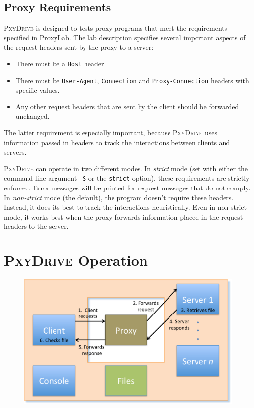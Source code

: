 \documentclass[11pt]{article}
\newcommand{\pxydrive}{\textsc{PxyDrive}}
\begin{document}
\subsection*{Proxy Requirements}

\pxydrive{} is designed to tests proxy programs that meet the
requirements specified in ProxyLab.  The lab description specifies several important aspects of the request headers sent by the proxy to a server:
\begin{itemize}
\item There must be a \texttt{Host} header
\item There must be \texttt{User-Agent}, \texttt{Connection} and \texttt{Proxy-Connection} headers with specific values.
\item Any other request headers that are sent by the client should be forwarded unchanged.
\end{itemize}
The latter requirement is especially important, because \pxydrive{} uses information passed in headers
 to track the interactions between clients and servers.

\pxydrive{} can operate in two different modes.  In {\em strict} mode
(set with either the command-line argument \texttt{-S} or the \texttt{strict} option), these
requirements are strictly enforced.  Error messages will be printed for request messages that do not comply.
In {\em non-strict} mode (the
default), the program doesn't require these headers.  Instead, it does
its best to track the interactions heuristically.  Even in non-strict
mode, it works best when the proxy
forwards information placed in the request headers to the server.

\section{\pxydrive{} Operation}
\label{sec:operation}


\begin{figure}
\begin{center}
\includegraphics[scale=0.6]{figs/transaction}
\end{center}
\label{fig:transaction}
\end{figure}
\end{document}
